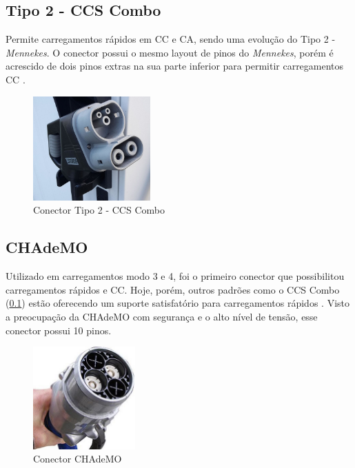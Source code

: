       \subsection{Tipo 2 - CCS Combo}
      \label{stateofart:plugs:combo}

        Permite carregamentos rápidos em \ac{CC} e \ac{CA}, sendo uma evolução do Tipo 2 - \textit{Mennekes}. O conector possui o mesmo layout de pinos do \textit{Mennekes}, porém é acrescido de dois pinos extras na sua parte inferior para permitir carregamentos \ac{CC} \cite{ieee-review-evse}.

        \begin{figure}[H]
          \begin{center}
            \includegraphics[width=0.40\textwidth,natwidth=1024,natheight=973]{assets/images/connectors-combo.jpg}
            \caption{Conector Tipo 2 - CCS Combo}
            \label{fig:combo}
          \end{center}
        \end{figure}

      \subsection{CHAdeMO}
      \label{stateofart:plugs:chademo}

        Utilizado em carregamentos modo 3 e 4, foi o primeiro conector que possibilitou carregamentos rápidos e \ac{CC}. Hoje, porém, outros padrões como o CCS Combo (\ref{stateofart:plugs:combo}) estão oferecendo um suporte satisfatório para carregamentos rápidos \cite{ieee-review-evse}. Visto a preocupação da CHAdeMO com segurança e o alto nível de tensão, esse conector possui 10 pinos.

        \begin{figure}[H]
          \begin{center}
            \includegraphics[width=0.35\textwidth,natwidth=300,natheight=300]{assets/images/connectors-chademo.jpg}
            \caption{Conector CHAdeMO}
            \label{fig:chademo}
          \end{center}
        \end{figure}

